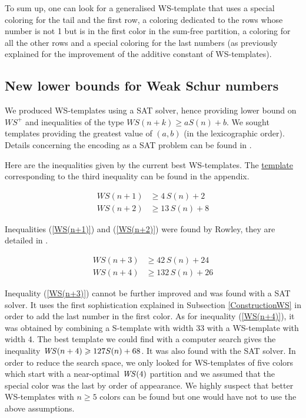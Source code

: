 \par
To sum up, one can look for a generalised WS-template that uses a special coloring for the tail and the first row, a
coloring dedicated to the rows whose number is not 1 but is in the first color in the sum-free partition, a coloring for all
the other rows and a special coloring for the last numbers (as previously explained for the improvement of the additive
constant of WS-templates).

\subsection{New lower bounds for Weak Schur numbers}

We produced WS-templates using a SAT solver, hence providing lower bound on \(WS^+\) and inequalities
of the type \(WS(n+k) \geqslant a S(n) + b\). We sought templates providing the greatest value of \((a, b)\) (in the 
lexicographic order). Details concerning the encoding as a SAT problem can be found in \cite{Heule2017}.

\par
Here are the inequalities given by the current best WS-templates. The \hyperref[WS-templates]{template} 
corresponding to the third inequality can be found in the appendix.

\begin{align}
	WS(n + 1) &\geqslant  4\,S(n)  +  2 \label{WS(n+1)} \\
	WS(n + 2) &\geqslant  13\,S(n)  +  8 \label{WS(n+2)} 
\end{align}

Inequalities (\ref{WS(n+1)}) and (\ref{WS(n+2)}) were found by Rowley, they are detailed in \cite{RowleyWS}.

\begin{align}
	WS(n + 3) &\geqslant  42\,S(n)  +  24 \label{WS(n+3)} \\
	WS(n + 4) &\geqslant  132\,S(n)  +  26 \label{WS(n+4)}
\end{align}

Inequality (\ref{WS(n+3)}) cannot be further improved and was found with a SAT solver. It uses the first 
sophistication explained in Subsection \ref{ConstructionWS} in order to add
the last number in the first color. As for inequality (\ref{WS(n+4)}), it was obtained by combining a S-template with 
width 33 with a WS-template with width 4. The best template we could find with a computer search gives the 
inequality \(\mathit{WS}(n+4) \geqslant 127 S(n) + 68\). It was also found with the SAT solver. In order to reduce the search space, 
we only looked for WS-templates of five colors which start with a near-optimal \(\mathit{WS}(4)\) partition and we assumed that the 
special color was the last by order of appearance. We highly suspect that better WS-templates with \(n \geqslant 5\) 
colors can be found but one would have not to use the above assumptions.

